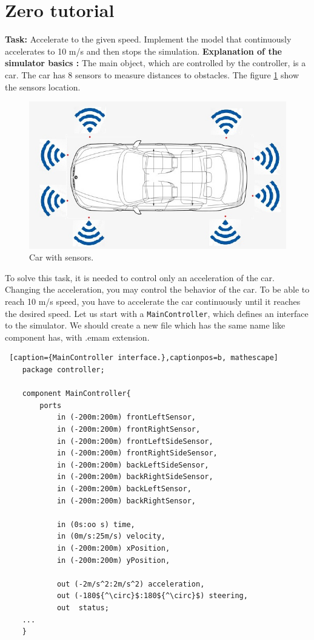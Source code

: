\section{Zero tutorial}
\textbf{Task:} Accelerate to the given speed.\newline
Implement the model that continuously accelerates to 10 m/s and then stops the simulation.\newline \newline
\textbf{Explanation of the simulator basics :}\newline
The main object, which are controlled by the controller, is a car. The car has 8 sensors to measure distances to obstacles. The figure \ref{fig:sensors} show the sensors location. \newline
\begin{figure}[h!]
    \centering
    \includegraphics[width=0.6\linewidth]{src/pic/car-with-sensors}
    \caption{Car with sensors.}
    \label{fig:sensors}
\end{figure} \newline
To solve this task, it is needed to control only an acceleration of the car. Changing the acceleration, you may control the behavior of the car. To be able to reach 10 m/s speed, you have to accelerate the car continuously until it reaches the desired speed. Let us start with a \texttt{MainController}, which defines an interface to the simulator. We should create a new file which has the same name like component has, with .emam extension.
\bigskip
\begin{lstlisting} [caption={MainController interface.},captionpos=b, mathescape]
    package controller;

    component MainController{
        ports                                   
            in (-200m:200m) frontLeftSensor,
            in (-200m:200m) frontRightSensor,
            in (-200m:200m) frontLeftSideSensor,
            in (-200m:200m) frontRightSideSensor,
            in (-200m:200m) backLeftSideSensor,
            in (-200m:200m) backRightSideSensor,
            in (-200m:200m) backLeftSensor,
            in (-200m:200m) backRightSensor,

            in (0s:oo s) time,
            in (0m/s:25m/s) velocity,
            in (-200m:200m) xPosition,
            in (-200m:200m) yPosition,
    
            out (-2m/s^2:2m/s^2) acceleration,
            out (-180${^\circ}$:180${^\circ}$) steering,
            out  status;
    ...
    }
\end{lstlisting}
